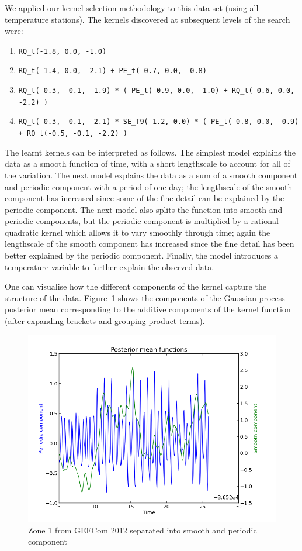 \documentclass[twoside]{article}
\begin{document}
We applied our kernel selection methodology to this data set (using all temperature stations).
The kernels discovered at subsequent levels of the search were:
\begin{enumerate}
\item \texttt{RQ\_t(-1.8,  0.0, -1.0)}
\item \texttt{RQ\_t(-1.4,  0.0, -2.1) + PE\_t(-0.7,  0.0, -0.8)}
\item \texttt{RQ\_t( 0.3, -0.1, -1.9) * ( PE\_t(-0.9,  0.0, -1.0) + RQ\_t(-0.6,  0.0, -2.2) )}
\item \texttt{RQ\_t( 0.3, -0.1, -2.1) * SE\_T9( 1.2,  0.0) * ( PE\_t(-0.8,  0.0, -0.9) + RQ\_t(-0.5, -0.1, -2.2) )}
\end{enumerate}
The learnt kernels can be interpreted as follows.
The simplest model explains the data as a smooth function of time, with a short lengthscale to account for all of the variation.
The next model explains the data as a sum of a smooth component and periodic component with a period of one day; the lengthscale of the smooth component has increased since some of the fine detail can be explained by the periodic component.
The next model also splits the function into smooth and periodic components, but the periodic component is multiplied by a rational quadratic kernel which allows it to vary smoothly through time; again the lengthscale of the smooth component has increased since the fine detail has been better explained by the periodic component.
Finally, the model introduces a temperature variable to further explain the observed data.

One can visualise how the different components of the kernel capture the structure of the data.
Figure~\ref{fig:gef_z01_two_means} shows the components of the Gaussian process posterior mean corresponding to the additive components of the kernel function (after expanding brackets and grouping product terms).

\begin{figure}
\includegraphics[width=\columnwidth]{../figures/gef_load_z01_500_posteriors}
\caption{Zone 1 from GEFCom 2012 separated into smooth and periodic component}
\label{fig:gef_z01_two_means}
\end{figure}
\end{document}
